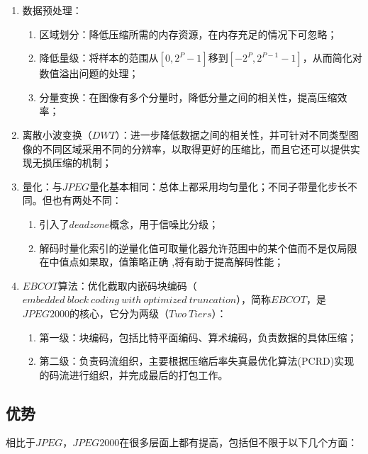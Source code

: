 \documentclass[UTF8]{ctexart}
\begin{document}
    			\begin{enumerate}[leftmargin=50pt]
    				\item 数据预处理：
            			\begin{enumerate}[leftmargin=20pt]
            				\item 区域划分：降低压缩所需的内存资源，在内存充足的情况下可忽略；
            				\item 降低量级：将样本的范围从$\left[ 0, 2^P-1 \right]$移到$\left[ -2^P, 2^{P-1}-1 \right]$，从而简化对数值溢出问题的处理；
            				\item 分量变换：在图像有多个分量时，降低分量之间的相关性，提高压缩效率；
            			\end{enumerate}
                    \item 离散小波变换（$DWT$）：进一步降低数据之间的相关性，并可针对不同类型图像的不同区域采用不同的分辨率，以取得更好的压缩比，而且它还可以提供实现无损压缩的机制；
                    \item 量化：与$JPEG$量化基本相同：总体上都采用均匀量化；不同子带量化步长不同。但也有两处不同：
            			\begin{enumerate}[leftmargin=20pt]
            				\item 引入了$deadzone$概念，用于信噪比分级；
                            \item 解码时量化索引的逆量化值可取量化器允许范围中的某个值而不是仅局限在中值点如果取，值策略正确 ,将有助于提高解码性能；
            			\end{enumerate}                    
                    \item $EBCOT$算法：优化截取内嵌码块编码（$embedded\ block\ coding\ with\ optimized\ truncation$），简称$EBCOT$，是$JPEG2000$的核心，它分为两级（$Two\ Tiers$）：
            			\begin{enumerate}[leftmargin=20pt]
            				\item 第一级：块编码，包括比特平面编码、算术编码，负责数据的具体压缩；
                            \item 第二级：负责码流组织，主要根据压缩后率失真最优化算法(PCRD)实现的码流进行组织，并完成最后的打包工作\cite{王伊洛EBCOT}。
                        \end{enumerate}                    
    			\end{enumerate}
		
        \subsection{优势}
            \indent 相比于$JPEG$，$JPEG2000$在很多层面上都有提高，包括但不限于以下几个方面\cite{liufangmin2002JPEG2000, digit_image_Gonzalez}：
\end{document}
